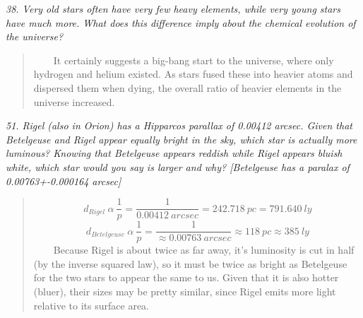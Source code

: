 \documentclass[letterpaper,10pt]{article}
\begin{document}
\par
\it
38. Very old stars often have very few heavy elements, while
very young stars have much more. What does this difference
imply about the chemical evolution of the universe?
\normalfont
\begin{quote}
    \par
	~~~~It certainly suggests a big-bang start to the universe,
    where only hydrogen and helium existed. As stars fused these
    into heavier atoms and dispersed them when dying, the overall
    ratio of heavier elements in the universe increased.
\end{quote}

\par
\it
51. Rigel (also in Orion) has a Hipparcos parallax of 0.00412
arcsec. Given that Betelgeuse and Rigel appear equally bright
in the sky, which star is actually more luminous? Knowing
that Betelgeuse appears reddish while Rigel appears bluish
white, which star would you say is larger and why? [Betelgeuse
has a paralax of 0.00763+-0.000164 arcsec]
\normalfont
\begin{quote}
    \begin{equation}
        d_{Rigel} ~ \alpha ~ \frac{1}{p} = \frac{1}{0.00412~arcsec} =
            242.718~pc = 791.640~ly
    \end{equation}
    \begin{equation}
        d_{Betelgeuse} ~ \alpha ~ \frac{1}{p} = \frac{1}{\approx0.00763~arcsec}
        \approx 118~pc \approx 385~ly
    \end{equation}
    ~~~~Because Rigel is about twice as far away, it's luminosity is cut in half
    (by the inverse squared law), so it must be twice as bright as Betelgeuse for
    the two stars to appear the same to us. Given that it is
    also hotter (bluer), their sizes may be pretty similar, since Rigel emits more
    light relative to its surface area.
\end{quote}
\end{document}
